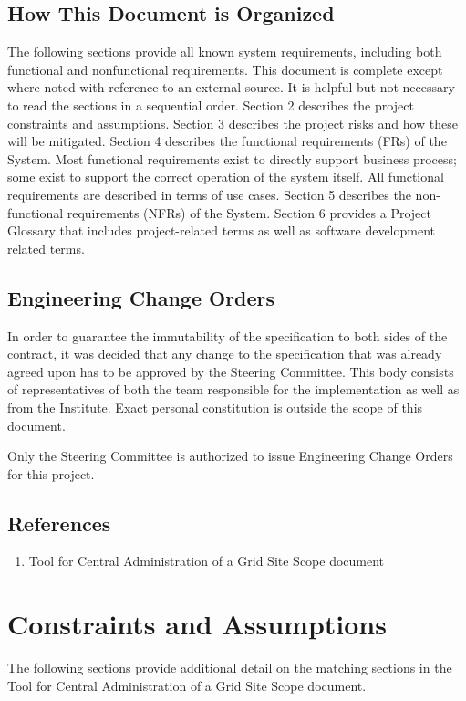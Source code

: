 \documentclass[12pt]{article}
\begin{document}
\subsection{How This Document is Organized}

The following sections provide all known system requirements, including both functional and nonfunctional requirements. 
This document is complete except where noted with reference to an external source. It is helpful but not necessary to read 
the sections in a sequential order. Section 2 describes the project constraints and assumptions. Section 3 describes the 
project risks and how these will be mitigated. Section 4 describes the functional requirements (FRs) of the System. Most 
functional requirements exist to directly support business process; some exist to support the correct operation of the system 
itself. All functional requirements are described in terms of use cases. Section 5 describes the non-functional requirements 
(NFRs) of the System. Section 6 provides a Project Glossary that includes project-related terms as well as software 
development related terms.

\subsection{Engineering Change Orders}
\label{steering-committee}

In order to guarantee the immutability of the specification to both sides of the
contract, it was decided that any change to the specification that was already
agreed upon has to be approved by the Steering Committee.  This body consists of
representatives of both the team responsible for the implementation as well as
from the Institute.  Exact personal constitution is outside the scope of this
document.

Only the Steering Committee is authorized to issue Engineering Change Orders for
this project.

\subsection{References}

\begin{enumerate}
	\item Tool for Central Administration of a Grid Site Scope document
\end{enumerate}


\section{Constraints and Assumptions}
The following sections provide additional detail on the matching sections in the Tool for Central Administration of a Grid Site 
Scope document.
\end{document}
